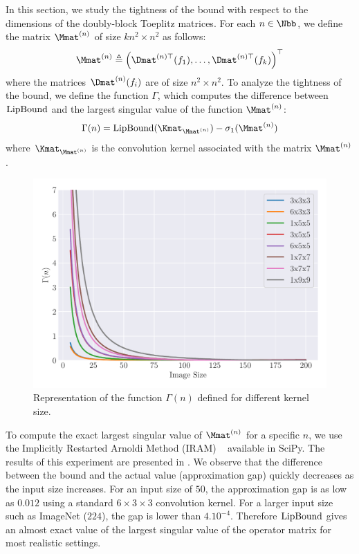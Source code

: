 In this section, we study the tightness of the bound with respect to the dimensions of the doubly-block Toeplitz matrices.
For each $n \in \Nbb$, we define the matrix  $\Mmat^{(n)}$ of size $kn^2 \times n^2$ as follows:
\begin{equation}
  \Mmat^{(n)} \triangleq \textstyle \leftmat \Dmat^{(n)\top}(f_1), \dots, \Dmat^{(n)\top}(f_k) \textstyle \rightmat^\top
\end{equation}
where the matrices $\Dmat^{(n)}(f_i)$ are of size $n^2 \times n^2$. 
To analyze the tightness of the bound, we define the function $\Gamma$, which computes the difference between $\mathrm{LipBound}$ and the largest singular value of the function $\Mmat^{(n)}$:
\begin{equation} \label{equation:function_convergence}
  \Gamma(n) = \lipbound(\Kmat_{\Mmat^{(n)}}) - \sigma_1(\Mmat^{(n)})
\end{equation}
where $\Kmat_{\Mmat^{(n)}}$ is the convolution kernel associated with the matrix $\Mmat^{(n)}$.

\begin{figure}[ht]
  \centering
  \includegraphics[width=\scalefigure\textwidth]{figures/main/ch5-lipschitz_regularization/convergence_bounds.pdf}
  \caption{Representation of the function $\Gamma(n)$ defined for different kernel size.}
  \label{figure:convergence_bound}
\end{figure}


To compute the exact largest singular value of $\Mmat^{(n)}$ for a specific $n$, we use the Implicitly Restarted Arnoldi Method (IRAM) ~\cite{lehoucq1996deflation} available in SciPy.
The results of this experiment are presented in .
We observe that the difference between the bound and the actual value (approximation gap) quickly decreases as the input size increases.
For an input size of $50$, the approximation gap is as low as $0.012$ using a standard $6\times3\times3$ convolution kernel.
For a larger input size such as ImageNet ($224$), the gap is lower than $4.10^{-4}$.
Therefore $\mathrm{LipBound}$ gives an almost exact value of the largest singular value of the operator matrix for most realistic settings.

